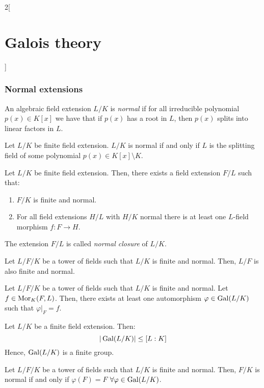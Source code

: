 \documentclass[../../../main.tex]{subfiles}
\begin{document}
\begin{multicols}{2}[\section{Galois theory}]
  \subsubsection{Normal extensions}
  \begin{definition}
    An algebraic field extension $L/K$ is \emph{normal} if for all irreducible polynomial $p(x)\in K[x]$ we have that if $p(x)$ has a root in $L$, then $p(x)$ splits into linear factors in $L$.
  \end{definition}
  \begin{theorem}
    Let $L/K$ be finite field extension. $L/K$ is normal if and only if $L$ is the splitting field of some polynomial $p(x)\in K[x]\setminus K$.
  \end{theorem}
  \begin{corollary}
    Let $L/K$ be finite field extension. Then, there exists a field extension $F/L$ such that:
    \begin{enumerate}
      \item $F/K$ is finite and normal.
      \item For all field extensions $H/L$ with $H/K$ normal there is at least one $L$-field morphism $f:F\rightarrow H$.
    \end{enumerate}
    The extension $F/L$ is called \emph{normal closure} of $L/K$.
  \end{corollary}
  \begin{corollary}
    Let $L/F/K$ be a tower of fields such that $L/K$ is finite and normal. Then, $L/F$ is also finite and normal.
  \end{corollary}
  \begin{corollary}
    Let $L/F/K$ be a tower of fields such that $L/K$ is finite and normal. Let $f\in\operatorname{Mor}_K(F,L)$. Then, there exists at least one automorphism $\varphi\in\operatorname{Gal}(L/K)$ such that $\varphi|_F=f$.
  \end{corollary}
  \begin{corollary}
    Let $L/K$ be a finite field extension. Then: $$|\operatorname{Gal}(L/K)|\leq[L:K]$$ Hence, $\operatorname{Gal}(L/K)$ is a finite group.
  \end{corollary}
  \begin{corollary}
    Let $L/F/K$ be a tower of fields such that $L/K$ is finite and normal. Then, $F/K$ is normal if and only if $\varphi(F)=F$ $\forall\varphi\in\operatorname{Gal}(L/K)$.
  \end{corollary}

\end{multicols}
\end{document}
